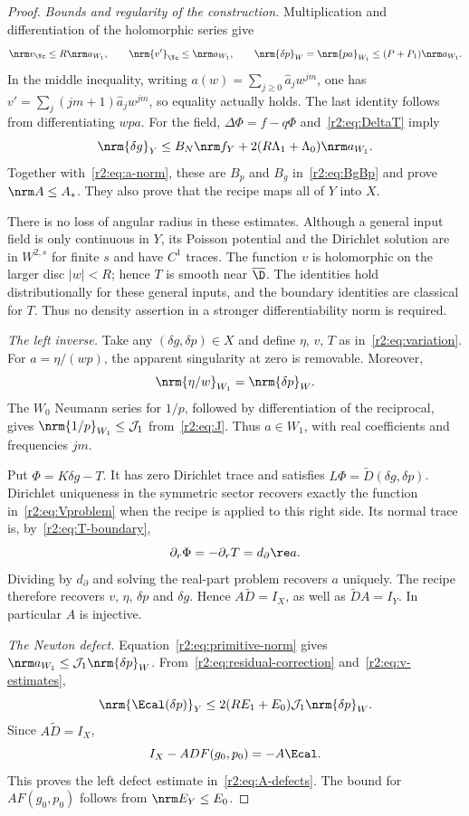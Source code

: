 \begin{proof}
\emph{Bounds and regularity of the construction.}
Multiplication and differentiation of the holomorphic series give
\begin{equation}\label{r2:eq:v-estimates}
 \nrm v_{\Yc}\le R\nrm a_{W_1},\qquad
 \nrm{v'}_{\Yc}\le\nrm a_{W_1},\qquad
 \nrm{\delta p}_W=\nrm{pa}_{W_1}
 \le(P+P_1)\nrm a_{W_1}.
\end{equation}
In the middle inequality, writing $a(w)=\sum_{j\ge0}\hat a_jw^{jm}$, one has $v'=\sum_j(jm+1)\hat a_jw^{jm}$, so equality actually holds. The last identity follows from differentiating $wpa$. For the field, $\Delta\Phi=f-q\Phi$ and~\eqref{r2:eq:DeltaT} imply
\[
 \nrm{\delta g}_Y
 \le B_N\nrm f_Y+2(R\Lambda_1+\Lambda_0)\nrm a_{W_1}.
\]
Together with~\eqref{r2:eq:a-norm}, these are $B_p$ and $B_g$ in~\eqref{r2:eq:BgBp} and prove $\nrm A\le A_*$. They also prove that the recipe maps all of $Y$ into $X$.

There is no loss of angular radius in these estimates. Although a general input field is only continuous in $Y$, its Poisson potential and the Dirichlet solution are in $W^{2,s}$ for finite $s$ and have $C^1$ traces. The function $v$ is holomorphic on the larger disc $|w|<R$; hence $T$ is smooth near $\overline\D$. The identities hold distributionally for these general inputs, and the boundary identities are classical for $T$. Thus no density assertion in a stronger differentiability norm is required.

\emph{The left inverse.}
Take any $(\delta g,\delta p)\in X$ and define $\eta$, $v$, $T$ as in~\eqref{r2:eq:variation}. For $a=\eta/(wp)$, the apparent singularity at zero is removable. Moreover,
\begin{equation}\label{r2:eq:primitive-norm}
 \nrm{\eta/w}_{W_1}=\nrm{\delta p}_W.
\end{equation}
The $W_0$ Neumann series for $1/p$, followed by differentiation of the reciprocal, gives $\nrm{1/p}_{W_1}\le\mathcal J_1$ from~\eqref{r2:eq:J}. Thus $a\in W_1$, with real coefficients and frequencies $jm$.

Put $\Phi=K\delta g-T$. It has zero Dirichlet trace and satisfies $L\Phi=\widetilde D(\delta g,\delta p)$. Dirichlet uniqueness in the symmetric sector recovers exactly the function in~\eqref{r2:eq:Vproblem} when the recipe is applied to this right side. Its normal trace is, by~\eqref{r2:eq:T-boundary},
\[
 \partial_r\Phi=-\partial_rT=d_\partial\re a.
\]
Dividing by $d_\partial$ and solving the real-part problem recovers $a$ uniquely. The recipe therefore recovers $v$, $\eta$, $\delta p$ and $\delta g$. Hence $A\widetilde D=I_X$, as well as $\widetilde DA=I_Y$. In particular $A$ is injective.

\emph{The Newton defect.}
Equation~\eqref{r2:eq:primitive-norm} gives $\nrm a_{W_1}\le\mathcal J_1\nrm{\delta p}_W$. From~\eqref{r2:eq:residual-correction} and~\eqref{r2:eq:v-estimates},
\[
 \nrm{\Ecal(\delta p)}_Y
 \le2(RE_1+E_0)\mathcal J_1\nrm{\delta p}_W.
\]
Since $A\widetilde D=I_X$,
\[
 I_X-A DF(g_0,p_0)=-A\Ecal.
\]
This proves the left defect estimate in~\eqref{r2:eq:A-defects}. The bound for $AF(g_0,p_0)$ follows from $\nrm E_Y\le E_0$.
\end{proof}

